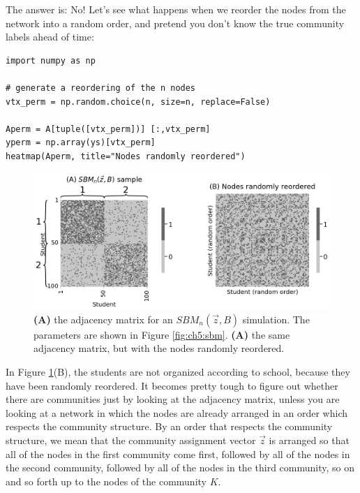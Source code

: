 The answer is: {No!} Let's see what happens when we reorder the nodes from the network into a random order, and pretend you don't know the true community labels ahead of time:

\begin{lstlisting}[style=python]
import numpy as np

# generate a reordering of the n nodes
vtx_perm = np.random.choice(n, size=n, replace=False)

Aperm = A[tuple([vtx_perm])] [:,vtx_perm]
yperm = np.array(ys)[vtx_perm]
heatmap(Aperm, title="Nodes randomly reordered")
\end{lstlisting}

\begin{figure}[h]
    \centering
    \includegraphics[width=\linewidth]{representations/ch5/Images/sbm_adj.png}
    \caption[Adjacency matrix for SBM with a community ordering of nodes and a random ordering of the nodes]{\textbf{(A)} the adjacency matrix for an $SBM_n(\vec z, B)$ simulation. The parameters are shown in Figure \ref{fig:ch5:sbm}. \textbf{(A)} the same adjacency matrix, but with the nodes randomly reordered.}
    \label{fig:ch5:sbm_adj}
\end{figure}
In Figure \ref{fig:ch5:sbm_adj}(B), the students are {not} organized according to school, because they have been randomly reordered. It becomes pretty tough to figure out whether there are communities just by looking at the adjacency matrix, unless you are looking at a network in which the nodes are {already arranged} in an order which respects the community structure. By an {order that respects the community structure}, we mean that the community assignment vector $\vec z$ is arranged so that all of the nodes in the first community come first, followed by all of the nodes in the second community, followed by all of the nodes in the third community, so on and so forth up to the nodes of the community $K$.

